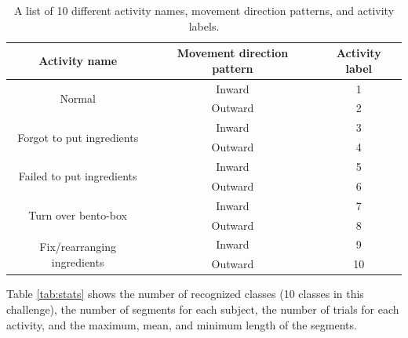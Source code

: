 \documentclass[graybox]{svmult}
\begin{document}
\begin{table}[ht]
    \centering
    \caption{A list of 10 different activity names, movement direction patterns, and activity labels.}
    \begin{tabular}{c|c|c}\hline\hline
    Activity name & Movement direction pattern & Activity label \\ \hline
    \multirow{2}{*}{Normal} & Inward & 1 \\ \cline{2-3}
    & Outward & 2 \\ \hline
    \multirow{2}{*}{Forgot to put ingredients} & Inward & 3 \\ \cline{2-3}
    & Outward & 4 \\ \hline
    \multirow{2}{*}{Failed to put ingredients} & Inward & 5 \\ \cline{2-3}
    & Outward & 6 \\ \hline
    \multirow{2}{*}{Turn over bento-box} & Inward & 7 \\ \cline{2-3}
    & Outward & 8 \\ \hline
    \multirow{2}{*}{Fix/rearranging ingredients} & Inward & 9 \\ \cline{2-3}
    & Outward & 10 \\ \hline
    \end{tabular}
    \label{tab:activity}
\end{table}

Table \ref{tab:stats} shows the number of recognized classes (10 classes in this challenge), the number of segments for each subject, the number of trials for each activity, and the maximum, mean, and minimum length of the segments.\par
\end{document}
